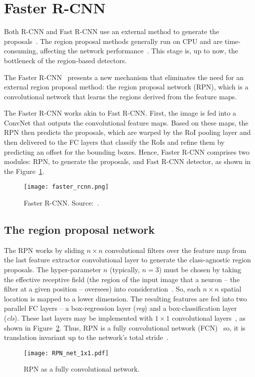 \section{Faster R-CNN}
%
Both R-CNN and Fast R-CNN use an external method to generate the proposals~\cite{Girshick2016RCNN, Girshick2015}.
The region proposal methods generally run on CPU and are time-consuming, affecting the network performance~\cite{Ren2017fasterpami}.
This stage is, up to now, the bottleneck of the region-based detectors.

The Faster R-CNN~\cite{Ren2017fasterpami} presents a new mechanism that eliminates the need for an external region proposal method:
the region proposal network (RPN),
which is a convolutional network that learns the regions derived from the feature maps.

The Faster R-CNN works akin to Fast R-CNN. First, the image is fed into a ConvNet that outputs the convolutional feature maps.
Based on these maps, the RPN then predicts the proposals, which are warped by the RoI pooling layer and then delivered to the FC layers that classify the RoIs and refine them by predicting an offset for the bounding boxes.
Hence, Faster R-CNN comprises two modules: RPN, to generate the proposals, and Fast R-CNN detector, as shown in the Figure~\ref{fig:Faster_R-CNN}.
%
%
\begin{figure}[th!]
	\centering
	\texttt{[image: faster\_rcnn.png]}
	\caption[Faster R-CNN]{Faster R-CNN. Source:~\cite{Ren2017fasterpami}.
	}
	\label{fig:Faster_R-CNN}
\end{figure}


\subsection{The region proposal network}\label{sec:rpn}
%
The RPN works by sliding $n\times n$ convolutional filters over the feature map from the last feature extractor convolutional layer to generate the class-agnostic region proposals.
The hyper-parameter $n$ (typically, $n=3$) must be chosen by taking the effective receptive field
(the region of the input image that a neuron -- the filter at a given position -- oversees)
into consideration~\cite{Ren2017fasterpami}.
So, each $n\times n$ spatial location is mapped to a lower dimension.
The resulting features are fed into two parallel FC layers -- a box-regression layer ({\it reg}) and a box-classification layer ({\it cls}).
These last layers may be implemented with $1\times 1$ convolutional layers~\cite{Ren2017fasterpami}, as shown in Figure~\ref{fig:rpn_fcn}.
Thus, RPN is a fully convolutional network (FCN)~\cite{Shelhamer2017} so, it is translation invariant up to the network's total stride~\cite{Ren2017fasterpami}.
%
%
%
\begin{figure}[bh!]
	\centering
	\texttt{[image: RPN\_net\_1x1.pdf]}
	\caption{RPN as a fully convolutional network.}
	\label{fig:rpn_fcn}
\end{figure}

